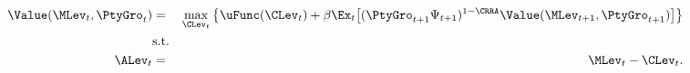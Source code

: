 \begin{eqnarray}
   \Value(\MLev_{t},\PtyGro_t) & = & \max_{\CLev_{t}} \big\{ \uFunc(\CLev_{t}) + \beta \Ex_{t} \big[ (\PtyGro_{t+1}\Psi_{t+1})^{1-\CRRA} \Value(\MLev_{t+1},\PtyGro_{t+1}) \big] \big\} \label{eq:RAscaledV}  
\\  & \mbox{s.t.} & \nonumber
\\   \ALev_{t} & = & \MLev_{t}-\CLev_{t}. \nonumber
\end{eqnarray}
